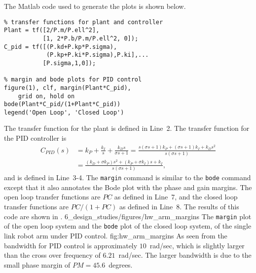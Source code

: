 
The Matlab code used to generate the plots is shown below.
\begin{lstlisting}
% transfer functions for plant and controller
Plant = tf([2/P.m/P.ell^2],
           [1, 2*P.b/P.m/P.ell^2, 0]);
C_pid = tf([(P.kd+P.kp*P.sigma),
            (P.kp+P.ki*P.sigma),P.ki],...
           [P.sigma,1,0]);

% margin and bode plots for PID control
figure(1), clf, margin(Plant*C_pid), 
	grid on, hold on
bode(Plant*C_pid/(1+Plant*C_pid)) 
legend('Open Loop', 'Closed Loop')
\end{lstlisting}
The transfer function for the plant is defined in Line~2.  The transfer function for the PID controller is
\begin{align*}
C_{PID}(s) &= k_P + \frac{k_I}{s} + \frac{k_D s}{\sigma s + 1} 
           = \frac{s(\sigma s+1)k_P + (\sigma s + 1)k_I + k_D s^2}{s(\sigma s + 1)} \\
           &= \frac{(k_D+\sigma k_P)s^2 + (k_P+\sigma k_I)s + k_I}{s(\sigma s + 1)},
\end{align*}
and is defined in Line~3-4.  The {\tt margin} command is similar to the {\tt bode} command except that it also annotates the Bode plot with the phase and gain margins.  The open loop transfer functions are $PC$ as defined in Line~7, and the closed loop transfer functions are $PC/(1+PC)$ as defined in Line~8.  The results of this code are shown in .
	{6_design_studies/figures/hw_arm_margins}
	{The {\tt margin} plot of the open loop system and the {\tt bode} plot of the closed loop system, of the single link robot arm under PID control.}
	{fig:hw_arm_margins}
As seen from  the bandwidth for PID control is approximately $10$~rad/sec, which is slightly larger than the cross over frequency of $6.21$~rad/sec.  The larger bandwidth is due to the small phase margin of $PM=45.6$~degrees.

